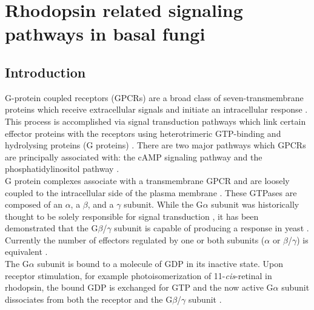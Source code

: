 \chapter{Rhodopsin related signaling pathways in basal fungi}
\label{chap:RhodAux}
\section{Introduction}
\indent G-protein coupled receptors (GPCRs) are a broad class of seven-transmembrane 
proteins which receive extracellular signals and initiate an intracellular response 
\cite{Lagerstrom2008}. This process is accomplished via signal transduction pathways 
which link certain effector proteins with the receptors using heterotrimeric GTP-binding 
and hydrolysing proteins (G proteins) \cite{Hepler1992}. There are two major pathways 
which GPCRs are principally associated with: the cAMP signaling pathway and the phosphatidylinositol pathway \cite{Gilman1987}.\\
\indent G protein complexes associate with a transmembrane GPCR and are loosely coupled to 
the intracellular side of the plasma membrane \cite{Clapham1997}.
These GTPases are composed of an $\alpha$, a $\beta$, and a $\gamma$ subunit. While the G$\alpha$ subunit 
was historically thought to be solely responsible for signal transduction \cite{Gilman1987}, 
it has been demonstrated that the G$\beta$/$\gamma$ subunit is capable of producing a 
response in yeast \cite{Clark1993}. Currently the number of effectors regulated by one 
or both subunits ($\alpha$ or $\beta$/$\gamma$) is equivalent \cite{Clapham1997}.\\ 
\indent The G$\alpha$ subunit is bound to a molecule of GDP in its inactive state. 
Upon receptor stimulation, for example photoisomerization of 11-\textit{cis}-retinal 
in rhodopsin, the bound GDP is exchanged for GTP and the now active G$\alpha$ subunit 
dissociates from both the receptor and the G$\beta$/$\gamma$ subunit \cite{Neves2002}.\\ 
